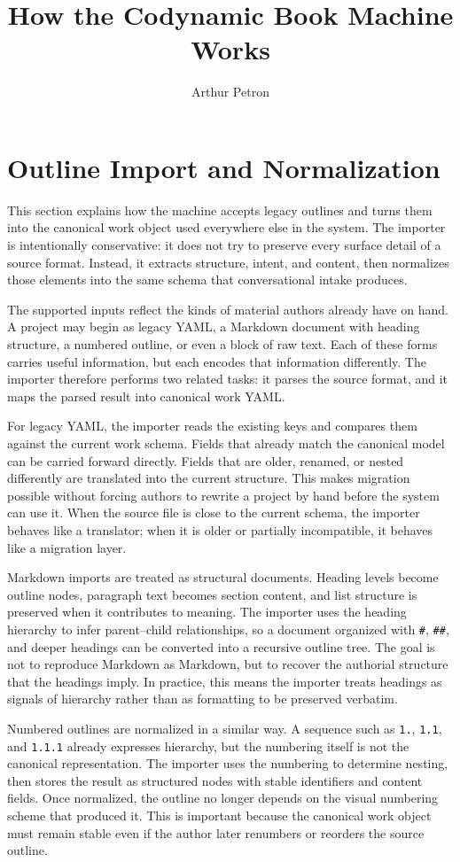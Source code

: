 \documentclass[11pt]{article}
\title{How the Codynamic Book Machine Works}
\author{Arthur Petron}
\begin{document}
\section*{Outline Import and Normalization}

This section explains how the machine accepts legacy outlines and turns them into the canonical work object used everywhere else in the system. The importer is intentionally conservative: it does not try to preserve every surface detail of a source format. Instead, it extracts structure, intent, and content, then normalizes those elements into the same schema that conversational intake produces.

The supported inputs reflect the kinds of material authors already have on hand. A project may begin as legacy YAML, a Markdown document with heading structure, a numbered outline, or even a block of raw text. Each of these forms carries useful information, but each encodes that information differently. The importer therefore performs two related tasks: it parses the source format, and it maps the parsed result into canonical work YAML.

For legacy YAML, the importer reads the existing keys and compares them against the current work schema. Fields that already match the canonical model can be carried forward directly. Fields that are older, renamed, or nested differently are translated into the current structure. This makes migration possible without forcing authors to rewrite a project by hand before the system can use it. When the source file is close to the current schema, the importer behaves like a translator; when it is older or partially incompatible, it behaves like a migration layer.

Markdown imports are treated as structural documents. Heading levels become outline nodes, paragraph text becomes section content, and list structure is preserved when it contributes to meaning. The importer uses the heading hierarchy to infer parent--child relationships, so a document organized with \texttt{\#}, \texttt{\#\#}, and deeper headings can be converted into a recursive outline tree. The goal is not to reproduce Markdown as Markdown, but to recover the authorial structure that the headings imply. In practice, this means the importer treats headings as signals of hierarchy rather than as formatting to be preserved verbatim.

Numbered outlines are normalized in a similar way. A sequence such as \texttt{1.}, \texttt{1.1}, and \texttt{1.1.1} already expresses hierarchy, but the numbering itself is not the canonical representation. The importer uses the numbering to determine nesting, then stores the result as structured nodes with stable identifiers and content fields. Once normalized, the outline no longer depends on the visual numbering scheme that produced it. This is important because the canonical work object must remain stable even if the author later renumbers or reorders the source outline.
\end{document}
